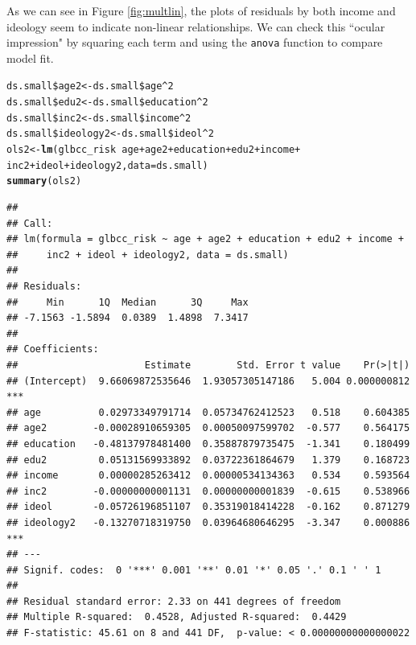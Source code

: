 \documentclass[11pt,openany]{book}\usepackage[]{graphicx}\usepackage[]{color}
\makeatletter
\newcommand{\hlnum}[1]{\textcolor[rgb]{0.686,0.059,0.569}{#1}}%
\newcommand{\hlopt}[1]{\textcolor[rgb]{0,0,0}{#1}}%
\newcommand{\hlstd}[1]{\textcolor[rgb]{0.345,0.345,0.345}{#1}}%
\newcommand{\hlkwb}[1]{\textcolor[rgb]{0.69,0.353,0.396}{#1}}%
\newcommand{\hlkwc}[1]{\textcolor[rgb]{0.333,0.667,0.333}{#1}}%
\newcommand{\hlkwd}[1]{\textcolor[rgb]{0.737,0.353,0.396}{\textbf{#1}}}%
\newenvironment{kframe}{%
 \def\at@end@of@kframe{}%
 \ifinner\ifhmode%
  \def\at@end@of@kframe{\end{minipage}}%
  \begin{minipage}{\columnwidth}%
 \fi\fi%
 \def\FrameCommand##1{\hskip\@totalleftmargin \hskip-\fboxsep
 \colorbox{shadecolor}{##1}\hskip-\fboxsep
     \hskip-\linewidth \hskip-\@totalleftmargin \hskip\columnwidth}%
 \MakeFramed {\advance\hsize-\width
   \@totalleftmargin\z@ \linewidth\hsize
   \@setminipage}}%
 {\par\unskip\endMakeFramed%
 \at@end@of@kframe}
\newenvironment{knitrout}{}{} %
\renewenvironment{knitrout}{\begin{singlespace}}{\end{singlespace}}
\makeatother
\begin{document}
\noindent As we can see in Figure \ref{fig:multlin}, the plots of residuals by both income and ideology seem to indicate non-linear relationships. We can check this ``ocular impression" by squaring each term and using the \texttt{anova} function to compare model fit.
\begin{knitrout}
\color{fgcolor}\begin{kframe}
\begin{alltt}
\hlstd{ds.small}\hlopt{\$}\hlstd{age2} \hlkwb{<-} \hlstd{ds.small}\hlopt{\$}\hlstd{age}\hlopt{^}\hlnum{2}
\hlstd{ds.small}\hlopt{\$}\hlstd{edu2} \hlkwb{<-} \hlstd{ds.small}\hlopt{\$}\hlstd{education}\hlopt{^}\hlnum{2}
\hlstd{ds.small}\hlopt{\$}\hlstd{inc2} \hlkwb{<-} \hlstd{ds.small}\hlopt{\$}\hlstd{income}\hlopt{^}\hlnum{2}
\hlstd{ds.small}\hlopt{\$}\hlstd{ideology2} \hlkwb{<-} \hlstd{ds.small}\hlopt{\$}\hlstd{ideol}\hlopt{^}\hlnum{2}
\hlstd{ols2} \hlkwb{<-} \hlkwd{lm}\hlstd{(glbcc_risk} \hlopt{~} \hlstd{age} \hlopt{+} \hlstd{age2} \hlopt{+} \hlstd{education} \hlopt{+} \hlstd{edu2} \hlopt{+} \hlstd{income} \hlopt{+}
    \hlstd{inc2} \hlopt{+} \hlstd{ideol} \hlopt{+} \hlstd{ideology2,} \hlkwc{data} \hlstd{= ds.small)}
\hlkwd{summary}\hlstd{(ols2)}
\end{alltt}
\begin{verbatim}
## 
## Call:
## lm(formula = glbcc_risk ~ age + age2 + education + edu2 + income + 
##     inc2 + ideol + ideology2, data = ds.small)
## 
## Residuals:
##     Min      1Q  Median      3Q     Max 
## -7.1563 -1.5894  0.0389  1.4898  7.3417 
## 
## Coefficients:
##                      Estimate        Std. Error t value    Pr(>|t|)    
## (Intercept)  9.66069872535646  1.93057305147186   5.004 0.000000812 ***
## age          0.02973349791714  0.05734762412523   0.518    0.604385    
## age2        -0.00028910659305  0.00050097599702  -0.577    0.564175    
## education   -0.48137978481400  0.35887879735475  -1.341    0.180499    
## edu2         0.05131569933892  0.03722361864679   1.379    0.168723    
## income       0.00000285263412  0.00000534134363   0.534    0.593564    
## inc2        -0.00000000001131  0.00000000001839  -0.615    0.538966    
## ideol       -0.05726196851107  0.35319018414228  -0.162    0.871279    
## ideology2   -0.13270718319750  0.03964680646295  -3.347    0.000886 ***
## ---
## Signif. codes:  0 '***' 0.001 '**' 0.01 '*' 0.05 '.' 0.1 ' ' 1
## 
## Residual standard error: 2.33 on 441 degrees of freedom
## Multiple R-squared:  0.4528,	Adjusted R-squared:  0.4429 
## F-statistic: 45.61 on 8 and 441 DF,  p-value: < 0.00000000000000022
\end{verbatim}
\end{kframe}
\end{knitrout}
\end{document}
